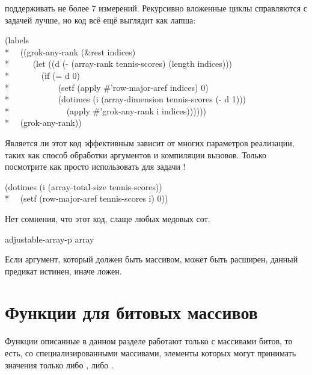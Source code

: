 \begin{defun}[Функция]
поддерживать не более 7 измерений. Рекурсивно вложенные циклы справляются с
задачей лучше, но код всё ещё выглядит как лапша:
\begin{lisp}
(labels \\*
~~((grok-any-rank (\&rest indices) \\*
~~~~~(let ((d (- (array-rank tennis-scores) (length indices))) \\*
~~~~~~~(if (= d 0) \\*
~~~~~~~~~~~(setf (apply \#'row-major-aref indices) 0) \\*
~~~~~~~~~~~(dotimes (i (array-dimension tennis-scores (- d 1))) \\*
~~~~~~~~~~~~~(apply \#'grok-any-rank i indices)))))) \\*
~~(grok-any-rank))
\end{lisp}
Является ли этот код эффективным зависит от многих параметров реализации, таких
как способ обработки  аргументов и компиляции  вызовов.
Только посмотрите как просто использовать для задачи !
\begin{lisp}
(dotimes (i (array-total-size tennis-scores)) \\*
~~(setf (row-major-aref tennis-scores i) 0))
\end{lisp}
Нет сомнения, что этот код, слаще любых медовых сот.
\end{defun}

\begin{defun}[Функция]
adjustable-array-p array

Если аргумент, который должен быть массивом, может быть расширен, данный
предикат истинен, иначе ложен.
\end{defun}

\section{Функции для битовых массивов}

Функции описанные в данном разделе работают только с массивами битов, то есть,
со специализированными массивами, элементы которых могут принимать значения
только либо , либо .

